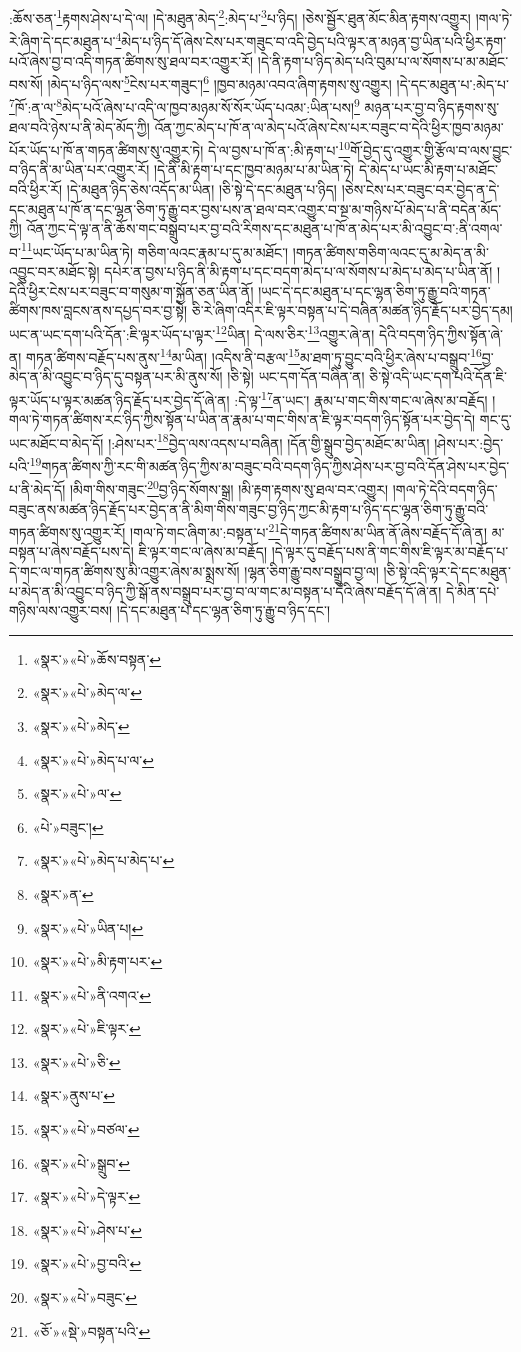 :ཆོས་ཅན་\footnote{«སྣར་»«པེ་»ཆོས་བསྟན་}རྟགས་ཤེས་པ་དེ་ལ། །དེ་མཐུན་མེད་\footnote{«སྣར་»«པེ་»མེད་ལ་}:མེད་པ་\footnote{«སྣར་»«པེ་»མེད་}པ་ཉིད། །ཅེས་སྦྱོར་ཐུན་མོང་མིན་རྟགས་འགྱུར། །གལ་ཏེ་རེ་ཞིག་དེ་དང་མཐུན་པ་\footnote{«སྣར་»«པེ་»མེད་པ་ལ་}མེད་པ་ཉིད་དོ་ཞེས་ངེས་པར་གཟུང་བ་འདི་བྱེད་པའི་ལྟར་ན་མཉན་བྱ་ཡིན་པའི་ཕྱིར་རྟག་པའོ་ཞེས་བྱ་བ་འདི་གཏན་ཚིགས་སུ་ཐལ་བར་འགྱུར་རོ། །དེ་ནི་རྟག་པ་ཉིད་མེད་པའི་བུམ་པ་ལ་སོགས་པ་མ་མཐོང་བས་སོ། །མེད་པ་ཉིད་ལས་\footnote{«སྣར་»«པེ་»ལ་}ངེས་པར་གཟུང་།\footnote{«པེ་»བཟུང་།} །ཁྱབ་མཉམ་འབའ་ཞིག་རྟགས་སུ་འགྱུར། །དེ་དང་མཐུན་པ་:མེད་པ་\footnote{«སྣར་»«པེ་»མེད་པ་མེད་པ་}ཁོ་:ན་ལ་\footnote{«སྣར་»ན་}མེད་པའོ་ཞེས་པ་འདི་ལ་ཁྱབ་མཉམ་སོ་སོར་ཡོད་པའམ་:ཡིན་པས།\footnote{«སྣར་»«པེ་»ཡིན་པ།} མཉན་པར་བྱ་བ་ཉིད་རྟགས་སུ་ཐལ་བའི་ཉེས་པ་ནི་མེད་མོད་ཀྱི། འོན་ཀྱང་མེད་པ་ཁོ་ན་ལ་མེད་པའོ་ཞེས་ངེས་པར་བཟུང་བ་དེའི་ཕྱིར་ཁྱབ་མཉམ་པོར་ཡོད་པ་ཁོ་ན་གཏན་ཚིགས་སུ་འགྱུར་ཏེ། དེ་ལ་བྱས་པ་ཁོ་ན་:མི་རྟག་པ་\footnote{«སྣར་»«པེ་»མི་རྟག་པར་}གོ་བྱེད་དུ་འགྱུར་གྱི་རྩོལ་བ་ལས་བྱུང་བ་ཉིད་ནི་མ་ཡིན་པར་འགྱུར་རོ། །དེ་ནི་མི་རྟག་པ་དང་ཁྱབ་མཉམ་པ་མ་ཡིན་ཏེ། དེ་མེད་པ་ཡང་མི་རྟག་པ་མཐོང་བའི་ཕྱིར་རོ། །དེ་མཐུན་ཉིད་ཅེས་འདོད་མ་ཡིན། །ཅི་སྟེ་དེ་དང་མཐུན་པ་ཉིད། །ཅེས་ངེས་པར་བཟུང་བར་བྱེད་ན་དེ་དང་མཐུན་པ་ཁོ་ན་དང་ལྷན་ཅིག་ཏུ་རྒྱུ་བར་བྱས་པས་ན་ཐལ་བར་འགྱུར་བ་སྔ་མ་གཉིས་པོ་མེད་པ་ནི་བདེན་མོད་ཀྱི། འོན་ཀྱང་དེ་ལྟ་ན་ནི་ཆོས་གང་བསྒྲུབ་པར་བྱ་བའི་རིགས་དང་མཐུན་པ་ཁོ་ན་མེད་པར་མི་འབྱུང་བ་:ནི་འགལ་བ་\footnote{«སྣར་»«པེ་»ནི་འགའ་}ཡང་ཡོད་པ་མ་ཡིན་ཏེ། གཅིག་ལའང་རྣམ་པ་དུ་མ་མཐོང་། །གཏན་ཚིགས་གཅིག་ལའང་དུ་མ་མེད་ན་མི་འབྱུང་བར་མཐོང་སྟེ། དཔེར་ན་བྱས་པ་ཉིད་ནི་མི་རྟག་པ་དང་བདག་མེད་པ་ལ་སོགས་པ་མེད་པ་མེད་པ་ཡིན་ནོ། །དེའི་ཕྱིར་ངེས་པར་བཟུང་བ་གསུམ་ག་སྐྱོན་ཅན་ཡིན་ནོ། །ཡང་དེ་དང་མཐུན་པ་དང་ལྷན་ཅིག་ཏུ་རྒྱུ་བའི་གཏན་ཚིགས་ཁས་བླངས་ནས་དཔྱད་བར་བྱ་སྟེ། ཅི་རེ་ཞིག་འདིར་ཇི་ལྟར་བསྟན་པ་དེ་བཞིན་མཚན་ཉིད་རྗོད་པར་བྱེད་དམ། ཡང་ན་ཡང་དག་པའི་དོན་:ཇི་ལྟར་ཡོད་པ་ལྟར་\footnote{«སྣར་»«པེ་»ཇི་ལྟར་}ཡིན། དེ་ལས་ཅིར་\footnote{«སྣར་»«པེ་»ཅི་}འགྱུར་ཞེ་ན། དེའི་བདག་ཉིད་ཀྱིས་སྟོན་ཞེ་ན། གཏན་ཚིགས་བརྗོད་པས་ནུས་\footnote{«སྣར་»ནུས་པ་}མ་ཡིན། །འདིས་ནི་བརྩལ་\footnote{«སྣར་»«པེ་»བཙལ་}མ་ཐག་ཏུ་བྱུང་བའི་ཕྱིར་ཞེས་པ་བསྒྲུབ་\footnote{«སྣར་»«པེ་»སྒྲུབ་}བྱ་མེད་ན་མི་འབྱུང་བ་ཉིད་དུ་བསྟན་པར་མི་ནུས་སོ། །ཅི་སྟེ། ཡང་དག་དོན་བཞིན་ན། ཅི་སྟེ་འདི་ཡང་དག་པའི་དོན་ཇི་ལྟར་ཡོད་པ་ལྟར་མཚན་ཉིད་རྗོད་པར་བྱེད་དོ་ཞེ་ན། :དེ་ལྟ་\footnote{«སྣར་»«པེ་»དེ་ལྟར་}ན་ཡང་། རྣམ་པ་གང་གིས་གང་ལ་ཞེས་མ་བརྗོད། །གལ་ཏེ་གཏན་ཚིགས་རང་ཉིད་ཀྱིས་སྟོན་པ་ཡིན་ན་རྣམ་པ་གང་གིས་ན་ཇི་ལྟར་བདག་ཉིད་སྟོན་པར་བྱེད་དེ། གང་དུ་ཡང་མཐོང་བ་མེད་དོ། །:ཤེས་པར་\footnote{«སྣར་»«པེ་»ཤེས་པ་}བྱེད་ལས་འདས་པ་བཞིན། །དོན་གྱི་སྒྲུབ་བྱེད་མཐོང་མ་ཡིན། །ཤེས་པར་:བྱེད་པའི་\footnote{«སྣར་»«པེ་»བྱ་བའི་}གཏན་ཚིགས་ཀྱི་རང་གི་མཚན་ཉིད་ཀྱིས་མ་བཟུང་བའི་བདག་ཉིད་ཀྱིས་ཤེས་པར་བྱ་བའི་དོན་ཤེས་པར་བྱེད་པ་ནི་མེད་དོ། །མིག་གིས་གཟུང་\footnote{«སྣར་»«པེ་»བཟུང་}བྱ་ཉིད་སོགས་སྒྲ། །མི་རྟག་རྟགས་སུ་ཐལ་བར་འགྱུར། །གལ་ཏེ་དེའི་བདག་ཉིད་བཟུང་ནས་མཚན་ཉིད་རྗོད་པར་བྱེད་ན་ནི་མིག་གིས་གཟུང་བྱ་ཉིད་ཀྱང་མི་རྟག་པ་ཉིད་དང་ལྷན་ཅིག་ཏུ་རྒྱུ་བའི་གཏན་ཚིགས་སུ་འགྱུར་རོ། །གལ་ཏེ་གང་ཞིག་མ་:བསྟན་པ་\footnote{«ཅོ་»«སྡེ་»བསྟན་པའི་}དེ་གཏན་ཚིགས་མ་ཡིན་ནོ་ཞེས་བརྗོད་དོ་ཞེ་ན། མ་བསྟན་པ་ཞེས་བརྗོད་པས་དེ། ཇི་ལྟར་གང་ལ་ཞེས་མ་བརྗོད། །དེ་ལྟར་དུ་བརྗོད་པས་ནི་གང་གིས་ཇི་ལྟར་མ་བརྗོད་པ་དེ་གང་ལ་གཏན་ཚིགས་སུ་མི་འགྱུར་ཞེས་མ་སྨྲས་སོ། །ལྷན་ཅིག་རྒྱུ་བས་བསྒྲུབ་བྱ་ལ། །ཅི་སྟེ་འདི་ལྟར་དེ་དང་མཐུན་པ་མེད་ན་མི་འབྱུང་བ་ཉིད་ཀྱི་སྒོ་ནས་བསྒྲུབ་པར་བྱ་བ་ལ་གང་མ་བསྟན་པ་དེའི་ཞེས་བརྗོད་དོ་ཞེ་ན། དེ་མིན་དཔེ་གཉིས་ལས་འགྱུར་བས། །དེ་དང་མཐུན་པ་དང་ལྷན་ཅིག་ཏུ་རྒྱུ་བ་ཉིད་དང་། 